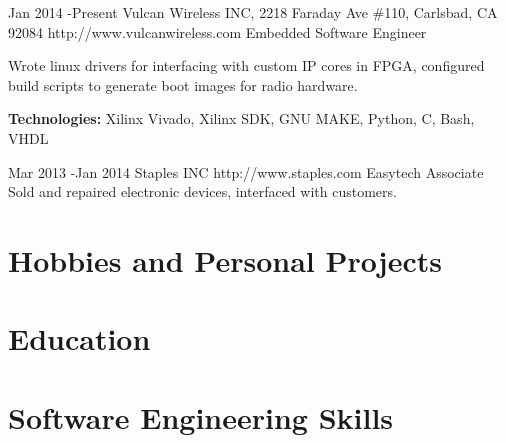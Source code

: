 \documentclass[10pt]{article} %
\begin{document}
\job
{Jan 2014 -}{Present}
{Vulcan Wireless INC, 2218 Faraday Ave \#110, Carlsbad, CA 92084}
{http://www.vulcanwireless.com}
{Embedded Software Engineer}
{Wrote linux drivers for interfacing with custom IP cores in FPGA, configured build scripts to generate boot images for radio hardware.\\
\rule{0mm}{5mm}\textbf{Technologies:} Xilinx Vivado, Xilinx SDK, GNU MAKE, Python, C, Bash, VHDL}


\job
{Mar 2013 -}{Jan 2014}
{Staples INC}
{http://www.staples.com}
{Easytech Associate}
{Sold and repaired electronic devices, interfaced with customers.}


\section {Hobbies and Personal Projects}



\section{Education}






\section{Software Engineering Skills}
\end{document}
